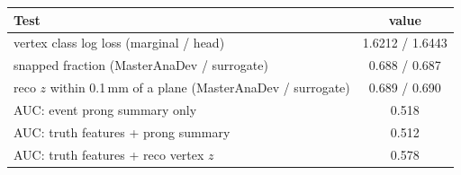 \begin{tabular}{lc}
\toprule
Test & value \\
\midrule
vertex class log loss (marginal / head) & 1.6212 / 1.6443 \\
snapped fraction (MasterAnaDev / surrogate) & 0.688 / 0.687 \\
reco $z$ within 0.1\,mm of a plane (MasterAnaDev / surrogate) & 0.689 / 0.690 \\
\midrule
AUC: event prong summary only & 0.518 \\
AUC: truth features + prong summary & 0.512 \\
AUC: truth features + reco vertex $z$ & 0.578 \\
\bottomrule
\end{tabular}
